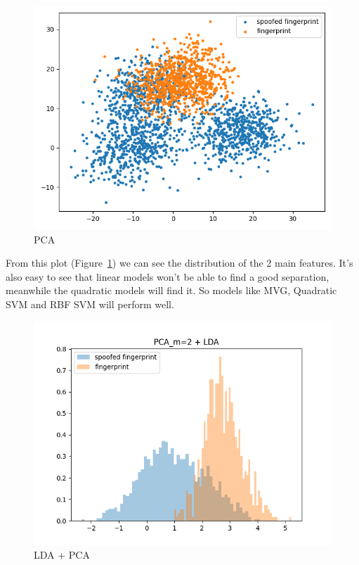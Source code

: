 \documentclass[english]{report}
\begin{document}
    \begin{figure}[H]
        \centering
        \includegraphics[scale=0.5]{../../images/feature_plot/PCA_m=2}
        \caption{PCA}
        \label{fig:PCA}
    \end{figure}

    From this plot (Figure~\ref{fig:PCA}) we can see the distribution of the 2 main features.
    It's also easy to see that linear models won't be able to find a good separation, meanwhile the quadratic models will find it.
    So models like MVG, Quadratic SVM and RBF SVM will perform well.

    \begin{figure}[H]
        \centering
        \includegraphics[scale=0.5]{../../images/feature_plot/histPCA_m=2 + LDA}
        \caption{LDA + PCA}
        \label{fig:LDA}
    \end{figure}
\end{document}
